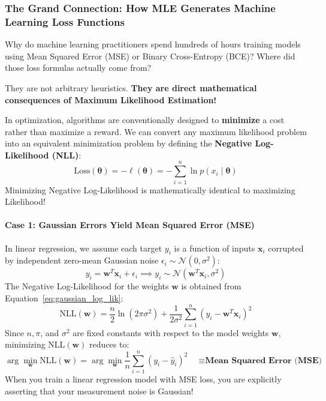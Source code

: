 \subsubsection{The Grand Connection: How MLE Generates Machine Learning Loss Functions}

Why do machine learning practitioners spend hundreds of hours training models using Mean Squared Error (MSE) or Binary Cross-Entropy (BCE)? Where did those loss formulas actually come from?

They are not arbitrary heuristics. \textbf{They are direct mathematical consequences of Maximum Likelihood Estimation!}

\begin{keyidea}
In optimization, algorithms are conventionally designed to \textbf{minimize} a cost rather than maximize a reward. We can convert any maximum likelihood problem into an equivalent minimization problem by defining the \textbf{Negative Log-Likelihood (NLL)}:
\begin{equation}
\text{Loss}(\mathbf{\theta}) = -\ell(\mathbf{\theta}) = -\sum_{i=1}^{n} \ln p(x_i \mid \mathbf{\theta})\label{eq:nll_def}
\end{equation}
Minimizing Negative Log-Likelihood is mathematically identical to maximizing Likelihood!
\end{keyidea}

\paragraph{Case 1: Gaussian Errors Yield Mean Squared Error (MSE)}
In linear regression, we assume each target $y_i$ is a function of inputs $\mathbf{x}_i$ corrupted by independent zero-mean Gaussian noise $\epsilon_i \sim \mathcal{N}(0, \sigma^2)$:
\begin{equation}
y_i = \mathbf{w}^T \mathbf{x}_i + \epsilon_i \implies y_i \sim \mathcal{N}(\mathbf{w}^T \mathbf{x}_i, \sigma^2)
\end{equation}
The Negative Log-Likelihood for the weights $\mathbf{w}$ is obtained from Equation~\eqref{eq:gaussian_log_lik}:
\begin{equation}
\text{NLL}(\mathbf{w}) = \frac{n}{2}\ln(2\pi\sigma^2) + \frac{1}{2\sigma^2} \sum_{i=1}^{n} \left( y_i - \mathbf{w}^T \mathbf{x}_i \right)^2
\end{equation}
Since $n, \pi$, and $\sigma^2$ are fixed constants with respect to the model weights $\mathbf{w}$, minimizing $\text{NLL}(\mathbf{w})$ reduces to:
\begin{equation}
\arg\min_{\mathbf{w}} \text{NLL}(\mathbf{w}) = \arg\min_{\mathbf{w}} \frac{1}{n}\sum_{i=1}^{n} \left( y_i - \hat{y}_i \right)^2 \quad \mathbf{\equiv \text{Mean Squared Error (MSE)}}
\end{equation}
When you train a linear regression model with MSE loss, you are explicitly asserting that your measurement noise is Gaussian!

